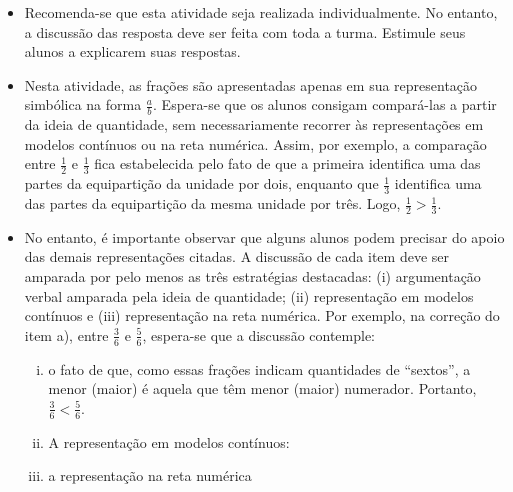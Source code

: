 \begin{multicols}{2}
   \begin{itemize}
   \item   Recomenda-se que esta atividade seja realizada individualmente. No entanto, a discussão das resposta deve ser feita com toda a turma. Estimule seus alunos a explicarem suas respostas.
   \item Nesta atividade, as frações são apresentadas apenas em sua representação simbólica na forma $\frac{a}{b}$. Espera-se que os alunos consigam compará-las a partir da ideia de quantidade, sem necessariamente recorrer às representações em modelos contínuos ou na reta numérica. Assim, por exemplo, a comparação entre $\frac{1}{2}$ e $\frac{1}{3}$ fica estabelecida pelo fato de que a primeira identifica uma das partes da equipartição da unidade por dois, enquanto que $\frac{1}{3}$ identifica uma das partes da equipartição da mesma unidade por três. Logo, $\frac{1}{2} > \frac{1}{3}$. 
   \item No entanto, é importante observar que alguns alunos podem precisar do apoio das demais representações citadas. A discussão de cada item deve ser amparada por pelo menos as três estratégias destacadas: (i) argumentação verbal amparada pela ideia de quantidade; (ii) representação em modelos contínuos e (iii) representação na reta numérica. Por exemplo, na correção do item a), entre $\frac{3}{6}$ e $\frac{5}{6}$, espera-se que a discussão contemple:
   \begin{enumerate}[(i)]
    \item o fato de que, como essas frações indicam quantidades de ``sextos'', a menor (maior) é aquela que têm menor (maior) numerador. Portanto, $\frac{3}{6}< \frac{5}{6}$. 
    \item A representação em modelos contínuos: 
    \item a representação na reta numérica %
    \end{enumerate}
   

\end{itemize}
\end{multicols}
